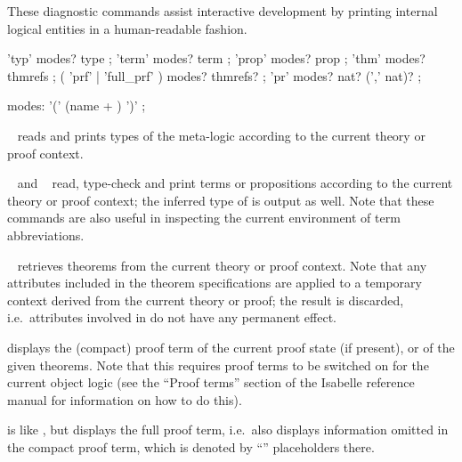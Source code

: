 \begin{isabellebody}
\begin{isamarkuptext}
  These diagnostic commands assist interactive development by printing
  internal logical entities in a human-readable fashion.

  \begin{rail}
    'typ' modes? type
    ;
    'term' modes? term
    ;
    'prop' modes? prop
    ;
    'thm' modes? thmrefs
    ;
    ( 'prf' | 'full\_prf' ) modes? thmrefs?
    ;
    'pr' modes? nat? (',' nat)?
    ;

    modes: '(' (name + ) ')'
    ;
  \end{rail}

  \begin{description}

  \item \hyperlink{command.typ}{\mbox{}}~\isa{{\isasymtau}} reads and prints types of the
  meta-logic according to the current theory or proof context.

  \item \hyperlink{command.term}{\mbox{}}~ and \hyperlink{command.prop}{\mbox{}}~\isa{{\isasymphi}}
  read, type-check and print terms or propositions according to the
  current theory or proof context; the inferred type of  is
  output as well.  Note that these commands are also useful in
  inspecting the current environment of term abbreviations.

  \item \hyperlink{command.thm}{\mbox{}}~ retrieves
  theorems from the current theory or proof context.  Note that any
  attributes included in the theorem specifications are applied to a
  temporary context derived from the current theory or proof; the
  result is discarded, i.e.\ attributes involved in  do not have any permanent effect.

  \item \hyperlink{command.prf}{\mbox{}} displays the (compact) proof term of the
  current proof state (if present), or of the given theorems. Note
  that this requires proof terms to be switched on for the current
  object logic (see the ``Proof terms'' section of the Isabelle
  reference manual for information on how to do this).

  \item \hyperlink{command.full-prf}{\mbox{}} is like \hyperlink{command.prf}{\mbox{}}, but displays
  the full proof term, i.e.\ also displays information omitted in the
  compact proof term, which is denoted by ``\isa{{\isacharunderscore}}'' placeholders
  there.


\end{description}
\end{isamarkuptext}
\end{isabellebody}
